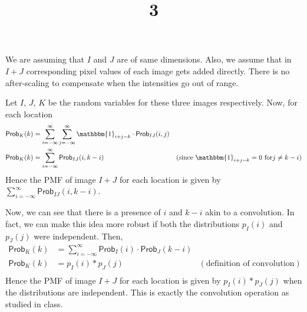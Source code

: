 \documentclass[a4paper]{article}
\title{3}
\date{}
\renewcommand{\P}{\textsf{Prob}}
\begin{document}
\maketitle
We are assuming that $I$ and $J$ are of same dimensions. Also, we assume that in $I+J$ corresponding pixel values of each image gets added directly. There is no after-scaling to compensate when the intensities go out of range.

Let $I$, $J$, $K$ be the random variables for these three images respectively. Now, for each location
\begin{equation}
	\begin{aligned}
		\P_K(k) &= \sum_{i=-\infty}^{\infty}\sum_{j=-\infty}^{\infty} \mathbbm{1}_{i+j=k} \cdot \P_{IJ}(i,j) &\\
		\P_K(k) &= \sum_{i=-\infty}^{\infty} \P_{IJ}(i,k-i) &(\text{since } \mathbbm{1}_{i+j=k} = 0 \text{ for} j\neq k-i)
	\end{aligned}
\end{equation}
Hence the PMF of image $I+J$ for each location is given by $\displaystyle\sum_{i=-\infty}^{\infty} \P_{IJ}(i,k-i)$.

Now, we can see that there is a presence of $i$ and $k-i$ akin to a convolution. In fact, we can make this idea more robust if both the distributions $p_I(i)$ and $p_J(j)$ were independent. Then, 
\begin{equation}
	\begin{aligned}
		\P_K(k) &= \sum_{i=-\infty}^{\infty} \P_{I}(i) \cdot \P_{J}(k-i) &\\
		\P_K(k) &= p_I(i) \ast p_J(j) &(\text{definition of convolution})\\
	\end{aligned}
\end{equation}
Hence the PMF of image $I+J$ for each location is given by $p_I(i) \ast p_J(j)$ when the distributions are independent. This is exactly the convolution operation as studied in class.
\end{document}
